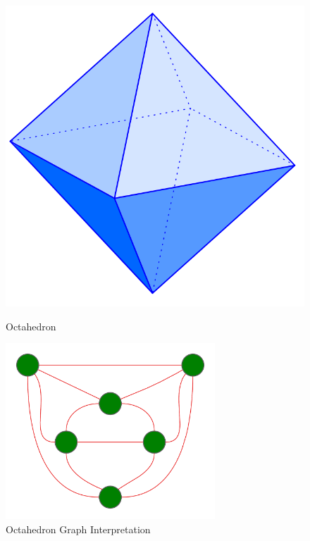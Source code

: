 \documentclass[bachelor, english]{algothesis}
\begin{document}
\begin{figure}[ht]
  \begin{minipage}{0.5\textwidth}
    \centering
    \includegraphics[width=0.7\linewidth]{figures/octahedron.png}
    \caption{Octahedron \protect\footnotemark}
    \label{fig:octahedron}
  \end{minipage}
  \begin{minipage}{0.5\textwidth}
    \centering
    \vspace{+0.8cm}
    \includegraphics[width=0.7\textwidth]{figures/octahedron_graph.png}
    \caption{Octahedron Graph Interpretation}
    \label{fig:octahedron_graph}
  \end{minipage}
\end{figure}

%
%
\end{document}
